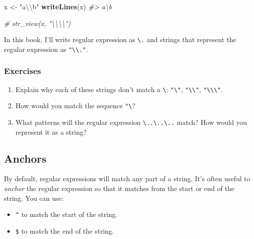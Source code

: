 \documentclass[]{book}
\newenvironment{Shaded}{\begin{snugshade}}{\end{snugshade}}
\newcommand{\KeywordTok}[1]{\textcolor[rgb]{0.13,0.29,0.53}{\textbf{{#1}}}}
\newcommand{\CharTok}[1]{\textcolor[rgb]{0.31,0.60,0.02}{{#1}}}
\newcommand{\StringTok}[1]{\textcolor[rgb]{0.31,0.60,0.02}{{#1}}}
\newcommand{\CommentTok}[1]{\textcolor[rgb]{0.56,0.35,0.01}{\textit{{#1}}}}
\newcommand{\NormalTok}[1]{{#1}}
\providecommand{\tightlist}{%
  \setlength{\itemsep}{0pt}\setlength{\parskip}{0pt}}
\begin{document}
\begin{Shaded}
\begin{Highlighting}[]
\NormalTok{x <-}\StringTok{ "a}\CharTok{\textbackslash{}\textbackslash{}}\StringTok{b"}
\KeywordTok{writeLines}\NormalTok{(x)}
\CommentTok{#> a\textbackslash{}b}

\CommentTok{# str_view(x, "\textbackslash{}\textbackslash{}\textbackslash{}\textbackslash{}")}
\end{Highlighting}
\end{Shaded}

In this book, I'll write regular expression as
\texttt{\textbackslash{}.} and strings that represent the regular
expression as \texttt{"\textbackslash{}\textbackslash{}."}.

\subsubsection{Exercises}\label{exercises-31}

\begin{enumerate}
\def\labelenumi{\arabic{enumi}.}
\item
  Explain why each of these strings don't match a
  \texttt{\textbackslash{}}: \texttt{"\textbackslash{}"},
  \texttt{"\textbackslash{}\textbackslash{}"},
  \texttt{"\textbackslash{}\textbackslash{}\textbackslash{}"}.
\item
  How would you match the sequence
  \texttt{"\textquotesingle{}\textbackslash{}}?
\item
  What patterns will the regular expression
  \texttt{\textbackslash{}..\textbackslash{}..\textbackslash{}..} match?
  How would you represent it as a string?
\end{enumerate}

\subsection{Anchors}\label{anchors}

By default, regular expressions will match any part of a string. It's
often useful to \emph{anchor} the regular expression so that it matches
from the start or end of the string. You can use:

\begin{itemize}
\tightlist
\item
  \texttt{\^{}} to match the start of the string.
\item
  \texttt{\$} to match the end of the string.
\end{itemize}
\end{document}

